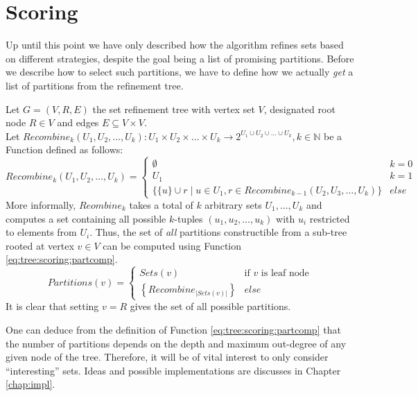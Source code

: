 	\clearpage
	
	\section{Scoring}
	\label{chap:gcg:scoring}
	
		Up until this point we have only described how the algorithm refines sets based on different strategies, despite the goal being a list of promising partitions.
		Before we describe how to select such partitions, we have to define how we actually \textit{get} a list of partitions from the refinement tree.
		
		Let $G = (V, R, E)$ the set refinement tree with vertex set $V$, designated root node $R \in V$ and edges $E \subseteq V \times V$. \\
		Let $Recombine_k(U_1, U_2, \ldots, U_k): U_1 \times U_2 \times \ldots \times U_k \xrightarrow{} 2^{U_1 \cup U_2 \cup \ldots \cup U_k}, k \in \mathbb{N}$ be a Function defined as follows:
		\begin{equation*}
			Recombine_k(U_1, U_2, \ldots, U_k) = \begin{cases}
				\emptyset & k = 0 \\
				U_1 & k = 1 \\
				\{ \{ u \} \cup r \mid u \in U_1, r \in Recombine_{k-1}(U_2, U_3, \ldots, U_k) \} & else
			\end{cases}
		\end{equation*}
		More informally, $Reombine_k$ takes a total of $k$ arbitrary sets $U_1, \ldots, U_k$ and computes a set containing all possible $k$-tuples $(u_1, u_2, \ldots, u_k)$ with $u_i$ restricted to elements from $U_i$.
		Thus, the set of \textit{all} partitions constructible from a sub-tree rooted at vertex $v \in V$ can be computed using Function \ref{eq:tree:scoring:partcomp}.
		\begin{equation}
		\label{eq:tree:scoring:partcomp}
			Partitions(v) = \begin{cases}
				Sets(v) & \text{if $v$ is leaf node} \\
				\left\{ Recombine_{|Sets(v)|} \right\} & else
			\end{cases}
		\end{equation}
		It is clear that setting $v = R$ gives the set of all possible partitions.
		
		One can deduce from the definition of Function \ref{eq:tree:scoring:partcomp} that the number of partitions depends on the depth and maximum out-degree of any given node of the tree.
		Therefore, it will be of vital interest to only consider \enquote{interesting} sets.
		Ideas and possible implementations are discusses in Chapter \ref{chap:impl}.
		

